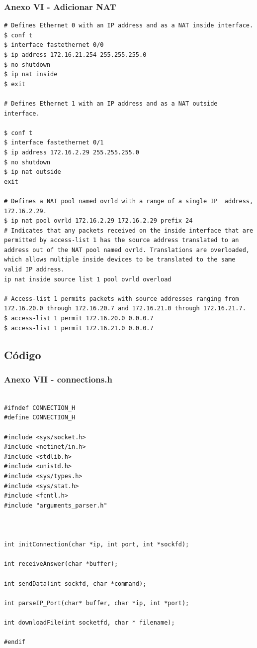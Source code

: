 \documentclass[11pt]{article}
\begin{document}
\bigskip

\subsubsection{Anexo VI - Adicionar NAT}

\begin{lstlisting}[style=bashStyle]
# Defines Ethernet 0 with an IP address and as a NAT inside interface.
$ conf t            
$ interface fastethernet 0/0
$ ip address 172.16.21.254 255.255.255.0
$ no shutdown
$ ip nat inside        
$ exit
 
# Defines Ethernet 1 with an IP address and as a NAT outside interface.

$ conf t
$ interface fastethernet 0/1
$ ip address 172.16.2.29 255.255.255.0
$ no shutdown
$ ip nat outside       
exit
 
# Defines a NAT pool named ovrld with a range of a single IP  address, 172.16.2.29.
$ ip nat pool ovrld 172.16.2.29 172.16.2.29 prefix 24
# Indicates that any packets received on the inside interface that are permitted by access-list 1 has the source address translated to an address out of the NAT pool named ovrld. Translations are overloaded, which allows multiple inside devices to be translated to the same valid IP address.
ip nat inside source list 1 pool ovrld overload
 
# Access-list 1 permits packets with source addresses ranging from 172.16.20.0 through 172.16.20.7 and 172.16.21.0 through 172.16.21.7.
$ access-list 1 permit 172.16.20.0 0.0.0.7
$ access-list 1 permit 172.16.21.0 0.0.0.7

\end{lstlisting}



\pagebreak


\subsection{Código}

\subsubsection{Anexo VII - connections.h}

\begin{lstlisting}[style=CStyle]

#ifndef CONNECTION_H
#define CONNECTION_H

#include <sys/socket.h>
#include <netinet/in.h>
#include <stdlib.h>
#include <unistd.h>
#include <sys/types.h>
#include <sys/stat.h>
#include <fcntl.h>
#include "arguments_parser.h"



int initConnection(char *ip, int port, int *sockfd);

int receiveAnswer(char *buffer);

int sendData(int sockfd, char *command);

int parseIP_Port(char* buffer, char *ip, int *port);

int downloadFile(int socketfd, char * filename);

#endif

\end{lstlisting}
\end{document}
